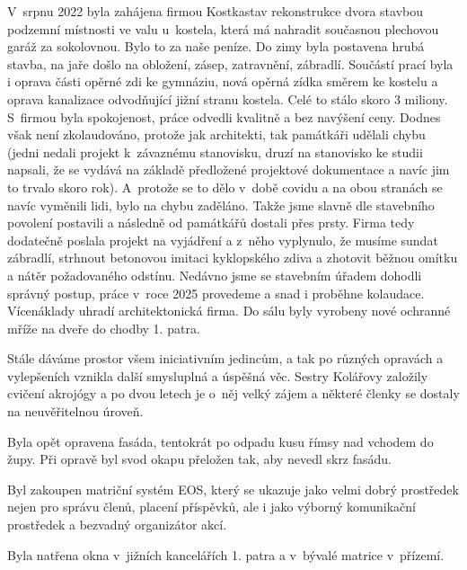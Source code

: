 \documentclass[11pt]{article}
\begin{document}
V~srpnu 2022 byla zahájena firmou Kostkastav rekonstrukce dvora stavbou podzemní místnosti ve valu u~kostela, která má nahradit současnou plechovou garáž za sokolovnou. Bylo to za naše peníze. Do zimy byla postavena hrubá stavba, na jaře došlo na obložení, zásep, zatravnění, zábradlí. Součástí prací byla i oprava části opěrné zdi ke gymnáziu, nová opěrná zídka směrem ke kostelu a oprava kanalizace odvodňující jižní stranu kostela. Celé to stálo skoro 3 miliony. S~firmou byla spokojenost, práce odvedli kvalitně a bez navýšení ceny. Dodnes však není zkolaudováno, protože jak architekti, tak památkáři udělali chybu (jedni nedali projekt k~závaznému stanovisku, druzí na stanovisko ke studii napsali, že se vydává na základě předložené projektové dokumentace a navíc jim to trvalo skoro rok). A~protože se to dělo v~době covidu a na obou stranách se navíc vyměnili lidi, bylo na chybu zaděláno. Takže jsme slavně dle stavebního povolení postavili a následně od památkářů dostali přes prsty. Firma tedy dodatečně poslala projekt na vyjádření a z~něho vyplynulo, že musíme sundat zábradlí, strhnout betonovou imitaci kyklopského zdiva a zhotovit běžnou omítku a nátěr požadovaného odstínu. Nedávno jsme se stavebním úřadem dohodli správný postup, práce v~roce 2025 provedeme a snad i proběhne kolaudace. Vícenáklady uhradí architektonická firma.
Do sálu byly vyrobeny nové ochranné mříže na dveře do chodby 1. patra.

Stále dáváme prostor všem iniciativním jedincům, a tak po různých opravách a vylepšeních vznikla další smysluplná a úspěšná věc. Sestry Kolářovy založily cvičení akrojógy a po dvou letech je o~něj velký zájem a některé členky se dostaly na neuvěřitelnou úroveň.

Byla opět opravena fasáda, tentokrát po odpadu kusu římsy nad vchodem do župy. Při opravě byl svod okapu přeložen tak, aby nevedl skrz fasádu.

Byl zakoupen matriční systém EOS, který se ukazuje jako velmi dobrý prostředek nejen pro správu členů, placení příspěvků, ale i jako výborný komunikační prostředek a bezvadný organizátor akcí.

Byla natřena okna v~jižních kancelářích 1. patra a v~bývalé matrice v~přízemí.
\end{document}
